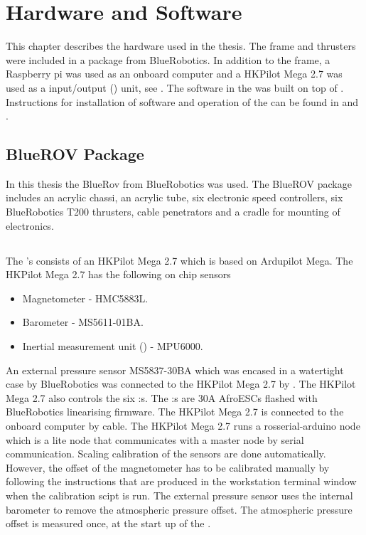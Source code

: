 \chapter{Hardware and Software}\label{cha:hardware}
This chapter describes the hardware used in the thesis. The \abbrROV frame and thrusters were included in a package from BlueRobotics. In addition to the \abbrROV frame, a Raspberry pi was used as an onboard computer and a HKPilot Mega 2.7  was used as a input/output (\abbrIO) unit, see . The software in the \abbrROV was built on top of \abbrROS.  Instructions for installation of software and operation of the \abbrROV can be found in  and .

\section{BlueROV Package}
In this thesis the BlueRov from BlueRobotics was used. The BlueROV package includes an acrylic chassi, an acrylic tube, six electronic speed controllers, six BlueRobotics T200 thrusters, cable penetrators and a cradle for mounting of electronics.
\section{\abbrROV \abbrIO}
The \abbrROV's \abbrIO consists of an HKPilot Mega 2.7 which is based on Ardupilot Mega. The HKPilot Mega 2.7 has the following on chip sensors
\begin{itemize}
    \item Magnetometer - HMC5883L.
    \item Barometer - MS5611-01BA.
    \item Inertial measurement unit (\abbrIMU) - MPU6000.
\end{itemize}
An external pressure sensor MS5837-30BA which was encased in a watertight case by BlueRobotics was connected to the HKPilot Mega 2.7 by \abbrIC.
The HKPilot Mega 2.7 also controls the six \abbrESC:s. The \abbrESC:s are 30A AfroESCs flashed with BlueRobotics linearising firmware. The HKPilot Mega 2.7 is connected to the onboard computer by \abbrUSB cable. The HKPilot Mega 2.7 runs a rosserial-arduino node which is a lite \abbrROS node that communicates with a master node by serial communication. Scaling calibration of the sensors are done automatically. However, the offset of the magnetometer has to be calibrated manually by following the instructions that are produced in the workstation terminal window when the calibration scipt is run. The external pressure sensor uses the internal barometer to remove the atmospheric pressure offset. The atmospheric pressure offset is measured once, at the start up of the \abbrROV.


